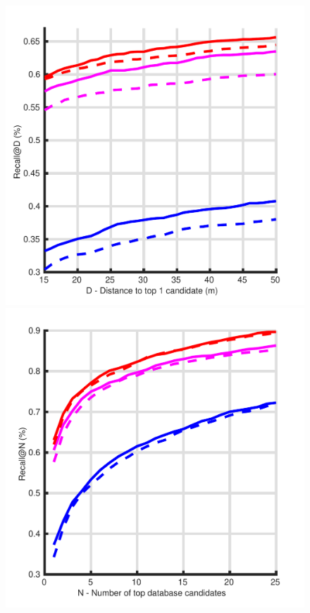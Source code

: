 \begin{figure}
	\centering
		
	\begin{minipage}{0.65\linewidth}		
		\centering
		
		\begin{minipage}{0.5\linewidth}
			\includegraphics[width=\linewidth]{preliminary/joint_distance}
		\end{minipage}\hfill
		\begin{minipage}{0.5\linewidth}
			\includegraphics[width=\linewidth]{preliminary/joint_recall}
		\end{minipage}
		

\end{minipage}
\end{figure}

